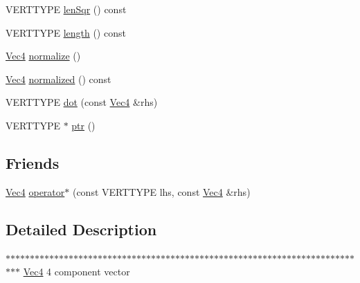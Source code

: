 \begin{DoxyCompactItemize}
\item 
VERTTYPE \hyperlink{struct_vec4_a5ebcf7d4a682910aec7ee16411577b95}{lenSqr} () const 
\item 
VERTTYPE \hyperlink{struct_vec4_a5d262747ec1ac70948184083229856ae}{length} () const 
\item 
\hyperlink{struct_vec4}{Vec4} \hyperlink{struct_vec4_aa1ccd768ba926162186e171b045a0ffd}{normalize} ()
\item 
\hyperlink{struct_vec4}{Vec4} \hyperlink{struct_vec4_a84ed396a034afd69c1d99ad544919697}{normalized} () const 
\item 
VERTTYPE \hyperlink{struct_vec4_a397c50dd0cb3ae59b437474eb97365fd}{dot} (const \hyperlink{struct_vec4}{Vec4} \&rhs)
\item 
VERTTYPE $\ast$ \hyperlink{struct_vec4_a9b5a4c32544136fb776c96e2ae83c78b}{ptr} ()
\end{DoxyCompactItemize}
\subsection*{Friends}
\begin{DoxyCompactItemize}
\item 
\hyperlink{struct_vec4}{Vec4} \hyperlink{struct_vec4_a875599435cd9bcac8ce250034a92c40d}{operator$\ast$} (const VERTTYPE lhs, const \hyperlink{struct_vec4}{Vec4} \&rhs)
\end{DoxyCompactItemize}


\subsection{Detailed Description}
$\ast$$\ast$$\ast$$\ast$$\ast$$\ast$$\ast$$\ast$$\ast$$\ast$$\ast$$\ast$$\ast$$\ast$$\ast$$\ast$$\ast$$\ast$$\ast$$\ast$$\ast$$\ast$$\ast$$\ast$$\ast$$\ast$$\ast$$\ast$$\ast$$\ast$$\ast$$\ast$$\ast$$\ast$$\ast$$\ast$$\ast$$\ast$$\ast$$\ast$$\ast$$\ast$$\ast$$\ast$$\ast$$\ast$$\ast$$\ast$$\ast$$\ast$$\ast$$\ast$$\ast$$\ast$$\ast$$\ast$$\ast$$\ast$$\ast$$\ast$$\ast$$\ast$$\ast$$\ast$$\ast$$\ast$$\ast$$\ast$$\ast$$\ast$$\ast$$\ast$$\ast$$\ast$$\ast$ \hyperlink{struct_vec4}{Vec4} 4 component vector 

